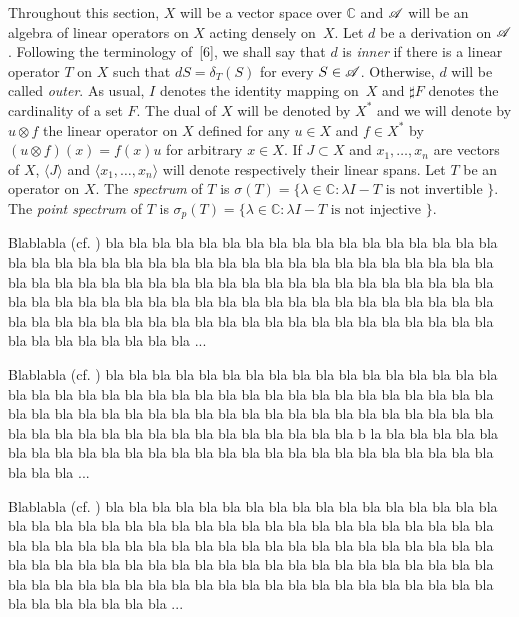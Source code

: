 \documentclass{amse}
\numberwithin{equation}{section}
\begin{document}
 Throughout this section, $X$ will be a vector space over
${\mathbb C}$ and ${\mathscr A} $ will be an algebra of linear operators
on $X$ acting densely on~$X$. Let $d$ be a derivation on ${\mathscr A}
$. Following the terminology of~[6], we shall say that $d$ is {\it
inner\/} if there is a linear operator $T$ on $X$ such that $dS=
\delta_T (S)$ for every $S\in {\mathscr A} $. Otherwise, $d$ will be
called {\it outer}. As usual, $I$ denotes the identity mapping
on~$X$ and $ \sharp F$ denotes the cardinality of a set $F$. The
dual of $X$ will be denoted by $X^*$ and we will denote by $u
\otimes f$ the linear operator on $X$ defined for any $u \in X$
and $f \in X^*$ by $(u \otimes f)(x)=f(x)u$ for arbitrary $x \in
X$.  If $ J \subset X$ and $x_1,\ldots ,x_n$ are vectors of $X$, $
\langle J \rangle$ and  $\langle x_1,\ldots ,x_n \rangle$ will
denote respectively their linear spans. Let $T$ be an operator on
$X$. The \textit{ spectrum} of $T$ is $\sigma (T)= \{ \lambda \in
{\mathbb C}: \lambda I- T \mbox { is not invertible } \}.$ The
\textit{ point spectrum} of $T$ is $\sigma_p (T)=\{ \lambda \in
{\mathbb C}: \lambda I - T \mbox { is not injective } \}$.

Blablabla (cf. \cite{ref1}) bla bla bla bla bla bla bla bla bla bla bla bla bla bla bla bla bla bla bla bla bla bla
bla bla bla bla bla bla bla bla bla bla bla bla bla bla bla bla bla bla bla bla bla bla bla bla bla bla bla bla bla
bla bla bla bla bla bla bla bla bla bla bla bla bla bla bla bla bla bla bla bla bla bla bla bla bla bla bla bla bla
bla bla bla bla bla bla bla bla bla bla bla bla bla bla bla bla bla bla bla bla bla bla bla bla bla bla bla bla bla ...

Blablabla (cf. \cite{ref1,ref2,ref3,ref4,ref5}) bla bla bla bla
bla bla bla bla bla bla bla bla bla bla bla bla bla bla bla bla
bla bla bla bla bla bla bla bla bla bla bla bla bla bla bla bla
bla bla bla bla bla bla bla bla bla bla bla bla bla bla bla bla
bla bla bla bla bla bla bla bla bla bla bla bla bla bla bla bla
bla bla bla bla bla bla b   la bla bla bla bla bla bla bla bla bla
bla bla bla bla bla bla bla bla bla bla bla bla bla bla bla bla
bla bla bla bla ...

Blablabla (cf. \cite{ref1,ref5}) bla bla bla bla bla bla bla bla bla bla bla bla bla bla bla bla bla bla bla bla bla
bla bla bla bla bla bla bla bla bla bla bla bla bla bla bla bla bla bla bla bla bla bla bla bla bla bla bla bla bla
bla bla bla bla bla bla bla bla bla bla bla bla bla bla bla bla bla bla bla bla bla bla bla bla bla bla bla bla bla
bla bla bla bla bla bla bla bla bla bla bla bla bla bla bla bla bla bla bla bla bla bla bla bla bla bla bla bla bla ...
\end{document}
